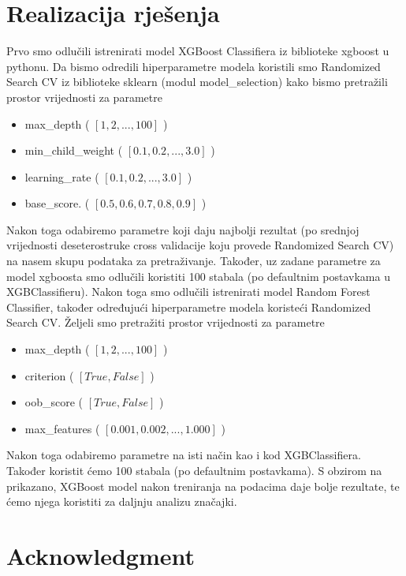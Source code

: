 \documentclass[conference]{IEEEtran}
\begin{document}
\section{Realizacija rješenja}
Prvo smo odlučili istrenirati model XGBoost Classifiera iz biblioteke xgboost u pythonu. Da bismo odredili hiperparametre modela koristili smo Randomized Search CV iz biblioteke sklearn (modul model\_selection) kako bismo pretražili prostor vrijednosti za parametre
\begin{itemize} 
\item max\_depth ( $[1, 2,..., 100]$ )
\item min\_child\_weight ( $[0.1, 0.2,..., 3.0]$ )
\item learning\_rate ( $[0.1, 0.2,..., 3.0]$ )
\item base\_score. ( $[0.5, 0.6, 0.7, 0.8, 0.9] $ )
\end{itemize}
Nakon toga odabiremo parametre koji daju najbolji rezultat (po srednjoj vrijednosti deseterostruke cross validacije koju provede Randomized Search CV) na nasem skupu podataka za pretraživanje. Također, uz zadane parametre za model xgboosta smo odlučili koristiti 100 stabala (po defaultnim postavkama u XGBClassifieru).
Nakon toga smo odlučili istrenirati model Random Forest Classifier, također određujući hiperparametre modela koristeći Randomized Search CV. Željeli smo pretražiti prostor vrijednosti za parametre 
\begin{itemize} 
\item max\_depth ( $[1, 2,..., 100]$ )
\item criterion ( $[True, False]$ )
\item oob\_score ( $[True, False]$ )
\item max\_features ( $[0.001, 0.002,..., 1.000] $ )
\end{itemize}
Nakon toga odabiremo parametre na isti način kao i kod XGBClassifiera. Također koristit ćemo 100 stabala (po defaultnim postavkama).
S obzirom na prikazano, XGBoost model nakon treniranja na podacima daje bolje rezultate, te ćemo njega koristiti za daljnju analizu značajki.



\section*{Acknowledgment}
\end{document}

